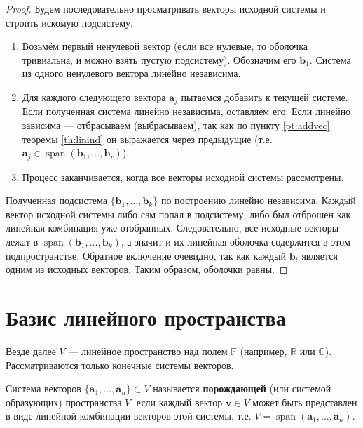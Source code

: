 \documentclass[10pt]{article}
\begin{document}
\begin{proof}
Будем последовательно просматривать векторы исходной системы и строить искомую подсистему.
\begin{enumerate}
    \item Возьмём первый ненулевой вектор (если все нулевые, то оболочка тривиальна, и можно взять пустую подсистему). Обозначим его \(\mathbf{b}_1\). Система из одного ненулевого вектора линейно независима.
    \item Для каждого следующего вектора \(\mathbf{a}_j\) пытаемся добавить к текущей системе. Если полученная система линейно независима, оставляем его. Если линейно зависима — отбрасываем (выбрасываем), так как по пункту \ref{pt:addvec} теоремы \ref{th:linind} он выражается через предыдущие (т.е. $\mathbf{a}_j \in \operatorname{span}(\mathbf{b}_1, \dots, \mathbf{b}_r)$).
    \item Процесс заканчивается, когда все векторы исходной системы рассмотрены.
\end{enumerate}
Полученная подсистема \(\{\mathbf{b}_1, \dots, \mathbf{b}_k\}\) по построению линейно независима. Каждый вектор исходной системы либо сам попал в подсистему, либо был отброшен как линейная комбинация уже отобранных. Следовательно, все исходные векторы лежат в \(\operatorname{span}(\mathbf{b}_1, \dots, \mathbf{b}_k)\), а значит и их линейная оболочка содержится в этом подпространстве. Обратное включение очевидно, так как каждый \(\mathbf{b}_i\) является одним из исходных векторов. Таким образом, оболочки равны.
\end{proof}

\section*{Базис линейного пространства}

Везде далее \(V\) — линейное пространство над полем \(\mathbb{F}\) (например, \(\mathbb{R}\) или \(\mathbb{C}\)). Рассматриваются только конечные системы векторов.

\begin{definition}
Система векторов \(\{\mathbf{a}_1,\dots,\mathbf{a}_n\} \subset V\) называется \textbf{порождающей} (или системой образующих) пространства \(V\), если каждый вектор \(\mathbf{v} \in V\) может быть представлен в виде линейной комбинации векторов этой системы, т.е. \(V = \operatorname{span}(\mathbf{a}_1,\dots,\mathbf{a}_n)\).
\end{definition}
\end{document}
